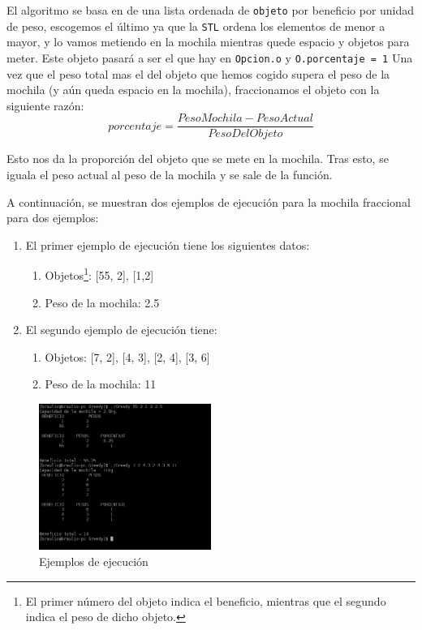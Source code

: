 \documentclass[10pt,a4paper,spanish]{report}
\begin{document}
El algoritmo se basa en de una lista ordenada de \verb|objeto| por beneficio por unidad de peso, escogemos el último ya que la \verb|STL| ordena los elementos de menor a mayor, y lo vamos metiendo en la mochila mientras quede espacio y objetos para meter. Este objeto pasará a ser el que hay en \verb|Opcion.o| y \verb|O.porcentaje = 1|  Una vez que el peso total mas el del objeto que hemos cogido supera el peso de la mochila (y aún queda espacio en la mochila), fraccionamos el objeto con la siguiente razón:
\begin{displaymath}
  porcentaje = \frac{PesoMochila - PesoActual}{PesoDelObjeto}
\end{displaymath}

Esto nos da la proporción del objeto que se mete en la mochila. Tras esto, se iguala el peso actual al peso de la mochila y se sale de la función.
\newpage
{}

\newpage

A continuación, se muestran dos ejemplos de ejecución para la mochila fraccional para dos ejemplos:

\begin{enumerate}[$\blacksquare$]
  \item El primer ejemplo de ejecución tiene los siguientes datos:
  \begin{enumerate}[$\spadesuit$]
    \item Objetos\footnote{El primer número del objeto indica el beneficio, mientras que el segundo indica el peso de dicho objeto.}: [55, 2], [1,2]
    \item Peso de la mochila: 2.5
  \end{enumerate}
  \item El segundo ejemplo de ejecución tiene:
  \begin{enumerate}[$\spadesuit$]
    \item Objetos: [7, 2], [4, 3], [2, 4], [3, 6]
    \item Peso de la mochila: 11
  \end{enumerate}
\end{enumerate}

\begin{center}
\begin{figure}[!h]
\centering
\includegraphics[width=0.5\textwidth]{figura3}
\caption{Ejemplos de ejecución}
\label{figura3}
\end{figure}
\end{center}
\end{document}
